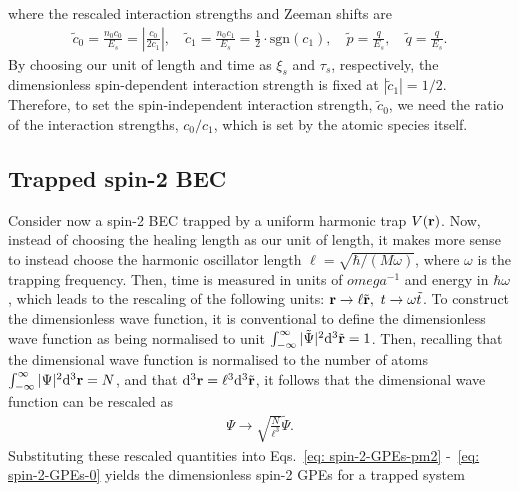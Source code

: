 where the rescaled interaction strengths and Zeeman shifts are
\begin{align}
    \tilde{c}_0 = \frac{n_0c_0}{E_s} = \left|\frac{c_0}{2c_1}\right|, \quad
    \tilde{c}_1 = \frac{n_0c_1}{E_s} = \frac{1}{2} \cdot \text{sgn}(c_1),\quad
    \tilde{p} = \frac{q}{E_s}, \quad
    \tilde{q} = \frac{q}{E_s}.
\end{align}
By choosing our unit of length and time as \(\xi_s\) and \(\tau_s\),
respectively, the dimensionless spin-dependent interaction strength is fixed
at \(|\tilde{c}_1| = 1/2\).
Therefore, to set the spin-independent interaction strength, \(\tilde{c}_0\),
we need the ratio of the interaction strengths, \(c_0/c_1\), which is set by
the atomic species itself.

\subsection{Trapped spin-2 BEC}
Consider now a spin-2 BEC trapped by a uniform harmonic trap \(V(\vb{r})\).
Now, instead of choosing the healing length as our unit of length, it makes more
sense to instead choose the harmonic oscillator length \(\ell =
\sqrt{\hbar/(M\omega)}\), where \(\omega \) is the trapping frequency.
Then, time is measured in units of \(omega^{-1}\) and energy in
\(\hbar\omega \), which leads to the rescaling of the following units:
\(\vb{r}\rightarrow \ell\tilde{\vb{r}},\ t \rightarrow \omega\tilde{t}\).
To construct the dimensionless wave function, it is conventional to define the
dimensionless wave function as being normalised to unit
\(\int_{-\infty}^\infty |\tilde{\Psi}|^2\dd^3\tilde{\vb{r}} = 1\).
Then, recalling that the dimensional wave function is normalised to the number
of atoms \(\int_{-\infty}^\infty |{\Psi}|^2\dd^3{\vb{r}} = N\), and that
\(\dd^3\vb{r} = \ell^3\dd^3\tilde{\vb{r}}\), it follows that the dimensional
wave function can be rescaled as
\begin{align}
    \Psi \rightarrow \sqrt{\frac{N}{\ell^3}}\tilde{\Psi}.
\end{align}
Substituting these rescaled quantities into Eqs.~\eqref{eq: spin-2-GPEs-pm2}
-~\eqref{eq: spin-2-GPEs-0} yields the dimensionless spin-2 GPEs for a trapped
system
